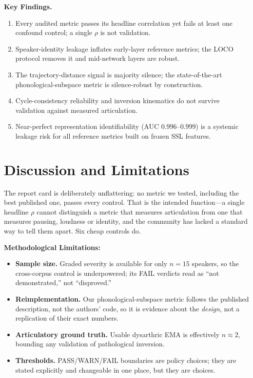 \documentclass[runningheads]{llncs}
\begin{document}
\textbf{Key Findings.}
\begin{enumerate}
\item Every audited metric passes its headline correlation yet fails at least one
confound control; a single $\rho$ is not validation.
\item Speaker-identity leakage inflates early-layer reference metrics; the LOCO
protocol removes it and mid-network layers are robust.
\item The trajectory-distance signal is majority silence; the state-of-the-art
phonological-subspace metric is silence-robust by construction.
\item Cycle-consistency reliability and inversion kinematics do not survive validation
against measured articulation.
\item Near-perfect representation identifiability (AUC $0.996$--$0.999$) is a systemic
leakage risk for all reference metrics built on frozen SSL features.
\end{enumerate}

\section{Discussion and Limitations}
The report card is deliberately unflattering: no metric we tested, including the best
published one, passes every control. That is the intended function---a single headline
$\rho$ cannot distinguish a metric that measures articulation from one that measures
pausing, loudness or identity, and the community has lacked a standard way to tell them
apart. Six cheap controls do.

\textbf{Methodological Limitations:}
\begin{itemize}
\item \textbf{Sample size.} Graded severity is available for only $n{=}15$ speakers,
so the cross-corpus control is underpowered; its FAIL verdicts read as ``not
demonstrated,'' not ``disproved.''
\item \textbf{Reimplementation.} Our phonological-subspace metric follows the published
description, not the authors' code, so it is evidence about the \emph{design}, not a
replication of their exact numbers.
\item \textbf{Articulatory ground truth.} Usable dysarthric EMA is effectively
$n{\approx}2$, bounding any validation of pathological inversion.
\item \textbf{Thresholds.} PASS/WARN/FAIL boundaries are policy choices; they are stated
explicitly and changeable in one place, but they are choices.
\end{itemize}
\end{document}
